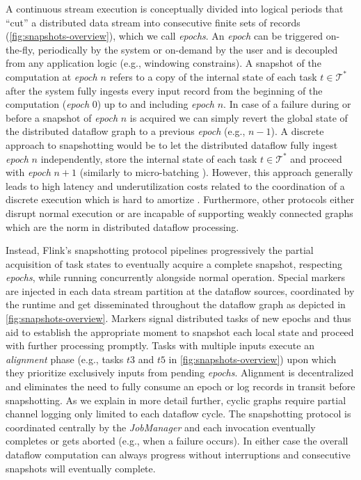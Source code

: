 A continuous stream execution is conceptually divided into logical periods that ``cut'' a distributed data stream into consecutive finite sets of records (\autoref{fig:snapshots-overview}), which we call \emph{epochs}. An \emph{epoch} can be triggered on-the-fly, periodically by the system or on-demand by the user and is decoupled from any application logic (e.g., windowing constrains). A snapshot of the computation at \emph{epoch} $n$ refers to a copy of the internal state of each task $t \in \mathcal{T^*}$ after the system fully ingests every input record from the beginning of the computation (\emph{epoch} 0) up to and including \emph{epoch} $n$. In case of a failure during or before a snapshot of \emph{epoch} $n$ is acquired we can simply revert the global state of the distributed dataflow graph to a previous \emph{epoch} (e.g., $n-1$). A discrete approach to snapshotting would be to let the distributed dataflow fully ingest \emph{epoch} $n$ independently, store the internal state of each task $t \in \mathcal{T^*}$ and proceed with \emph{epoch} $n+1$ (similarly to micro-batching \cite{zaharia2012discretized}). However, this approach generally leads to high latency and underutilization costs related to the coordination of a discrete execution which is hard to amortize \cite{venkataramandrizzle}. Furthermore, other protocols either disrupt normal execution \cite{murray2013naiad,jacques2016consistent} or are incapable of supporting weakly connected graphs \cite{chandy1985distributed} which are the norm in distributed dataflow processing.

Instead, Flink's snapshotting protocol pipelines progressively the partial acquisition of task states to eventually acquire a complete snapshot, respecting \emph{epochs}, while running concurrently alongside normal operation. Special markers are injected in each data stream partition at the dataflow sources, coordinated by the runtime and get disseminated throughout the dataflow graph as depicted in \autoref{fig:snapshots-overview}. Markers signal distributed tasks of new epochs and thus aid to establish the appropriate moment to snapshot each local state and proceed with further processing promptly. Tasks with multiple inputs execute an \emph{alignment} phase (e.g., tasks $t3$ and $t5$ in \autoref{fig:snapshots-overview}) upon which they prioritize exclusively inputs from pending \emph{epochs}. Alignment is decentralized and eliminates the need to fully consume an epoch or log records in transit before snapshotting. As we explain in more detail further, cyclic graphs require partial channel logging only limited to each dataflow cycle. The snapshotting protocol is coordinated centrally by the \emph{JobManager} and each invocation eventually completes or gets aborted (e.g., when a failure occurs). In either case the overall dataflow computation can always progress without interruptions and consecutive snapshots will eventually complete.

